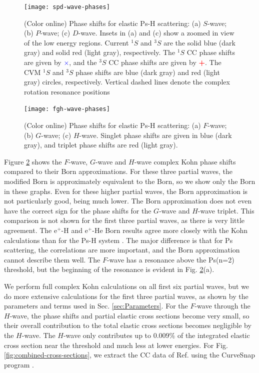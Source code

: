 \documentclass[preprint,showpacs,showkeys,preprintnumbers,amsmath,amssymb,longbibliography,pra,aps]{revtex4-1}
\begin{document}
\begin{figure}[H]
	\centering
	\texttt{[image: spd-wave-phases]}
	\caption{(Color online) Phase shifts for elastic Ps-H scattering: (a) $S$-wave;
(b) $P$-wave; (c) $D$-wave. Insets in (a) and (c) show a zoomed in view of 
the low energy regions. Current $^1S$ and $^3S$ are the solid blue (dark gray)
 and solid red (light gray), respectively. The $^1S$ CC phase shifts
\cite{Walters2004} are given by \mbox{\textcolor{blue}{$\times$}}, and the
$^3S$ CC phase shifts \cite{Blackwood2002} are given by
\mbox{\textcolor{red}{\textbf{+}}}. The CVM $^1S$ and $^3S$ phase shifts
\cite{Zhang2012} are blue (dark gray) and red (light gray) circles,
respectively. Vertical dashed lines denote the complex rotation resonance
positions \cite{Yan1999,Yan1998a,Ho1998}}
	\label{fig:spd-wave-phases}
\end{figure}

\begin{figure}[H]
	\centering
	\texttt{[image: fgh-wave-phases]}
	\caption{(Color online) Phase shifts for elastic Ps-H scattering:
(a) $F$-wave; (b) $G$-wave; (c) $H$-wave. Singlet phase shifts are given in blue
(dark gray), and triplet phase shifts are red (light gray).}
	\label{fig:fgh-wave-phases}
\end{figure}

Figure \ref{fig:fgh-wave-phases} shows the $F$-wave, $G$-wave and $H$-wave complex 
Kohn phase shifts compared to their Born approximations. For these three 
partial waves, the modified Born is approximately equivalent to the Born, so 
we show only the Born in these graphs. Even for these higher partial waves, 
the Born approximation is not particularly good, being much lower. The Born 
approximation does not even have the correct sign for the phase shifts for 
the $G$-wave and $H$-wave triplet. This comparison is not shown for the first 
three partial waves, as there is very little agreement. The e$^+$-H and
e$^+$-He Born results agree more closely with the Kohn calculations than
for the Ps-H system \cite{VanReeth2014}. The major difference is that for Ps
scattering, the correlations are more important, and the Born approximation
cannot describe them well. The $F$-wave has a resonance above the Ps(n=2)
threshold, but the beginning of the resonance is evident in Fig.
\ref{fig:fgh-wave-phases}(a).

We perform full complex Kohn calculations on all first six partial waves, but 
we do more extensive calculations for the first three partial waves, as shown 
by the parameters and terms used in Sec. \ref{sec:Parameters}. For the $F$-wave 
through the $H$-wave, the phase shifts and partial elastic cross sections 
become very small, so their overall contribution to the total elastic cross 
sections becomes negligible by the $H$-wave. The $H$-wave only contributes up to
$0.009\%$ of the integrated elastic cross section near the threshold and much 
less at lower energies. For Fig. \ref{fig:combined-cross-sections}, we 
extract the CC data of Ref. \cite{Walters2004} using the CurveSnap program 
\cite{CurveSnap}.
\end{document}
